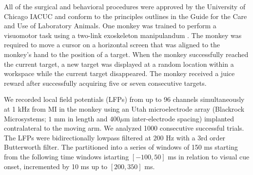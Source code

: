 \documentclass[a4paper]{jpconf}
\begin{document}
All of the surgical and behavioral procedures were approved by the
University of Chicago IACUC and conform to the principles outlines
in the Guide for the Care and Use of Laboratory Animals. One
monkey was trained to perform a visuomotor task using a two-link
exoskeleton manipulandum \cite{ref:Scott99}. The monkey was
required to move a cursor on a horizontal screen that was aligned
to the monkey's hand to the position of a target. When the monkey
successfully reached the current target, a new target was
displayed at a random location within a workspace while the
current target disappeared. The monkey received a juice reward
after successfully acquiring five or seven consecutive targets.

We recorded local field potentials (LFPs) from up to 96 channels simultaneously at 1 kHz from MI in
the monkey using an Utah microelectrode array (Blackrock
Microsystems; $1$ mm in length and $400 \mu$m inter-electrode
spacing) implanted contralateral to the moving arm. We analyzed 1000 consecutive
successful trials. The LFPs were bidirectionally lowpass filtered at $200$ Hz with a 3rd order Butterworth filter. The partitioned into a series of windows of 150 ms starting from  the following time windows istarting  $[-100, 50]$ ms in relation to visual cue onset, incremented by 10 ms up to 
$[200, 350]$ ms.
\end{document}
